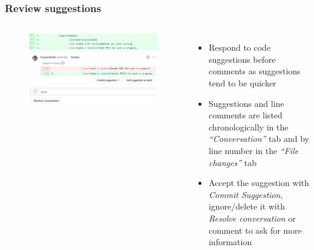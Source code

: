 \documentclass[aspectratio=169]{beamer} %
\begin{document}
\begin{frame}
	\frametitle{Review suggestions}
	\begin{columns}[c]

		\vspace{-.75cm}
		\begin{figure}
			\centering
			\includegraphics[width=\textwidth]{./img/review-suggestion-1.png}
		\end{figure}

		\begin{itemize}
			\setlength\itemsep{1em}
			\item Respond to code suggestions before comments as suggestions tend to be quicker
			\item Suggestions and line comments are listed chronologically
			in the \textit{``Conversation''} tab and
			by line number in the \textit{``File changes''} tab
			\item Accept the suggestion with \textit{Commit Suggestion},
			ignore/delete it with \textit{Resolve conversation}
			or comment to ask for more information
		\end{itemize}

	\end{columns}
\end{frame}
\end{document}
